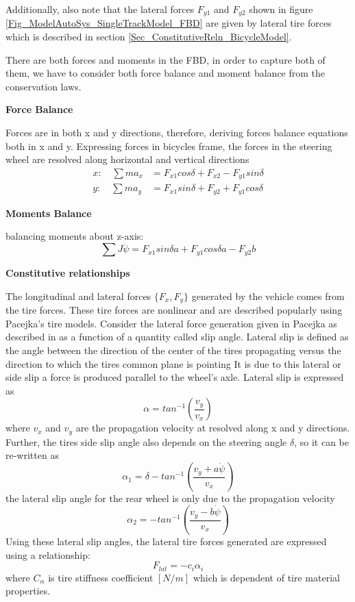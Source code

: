 Additionally, also note that the lateral forces $F_{y1}$ and $F_{y2}$ shown in figure \ref{Fig_ModelAutoSys_SingleTrackModel_FBD} are given by lateral tire forces which is described in section \ref{Sec_ConstitutiveReln_BicycleModel}.

There are both forces and moments in the FBD, in order to capture both of them, we have to consider both force balance and moment balance from the conservation laws.

\textbf{Force Balance}

Forces are in both x and y directions, therefore, deriving forces balance equations both in x and y. Expressing forces in bicycles frame, the forces in the steering wheel are resolved along horizontal and vertical directions
\begin{align}
	x: \quad \sum m a_x &= F_{x1}cos\delta + F_{x2} - F_{y1}sin\delta \\
	y: \quad \sum m a_y &= F_{x1}sin\delta + F_{y2} + F_{y1}cos\delta
\end{align}

\textbf{Moments Balance}

balancing moments about z-axis:
\begin{equation}
	\sum J \ddot{\psi} = F_{x1} sin\delta a + F_{y1} cos\delta a - F_{y2} b
\end{equation}

\textbf{Constitutive relationships} \label{Sec_ConstitutiveReln_BicycleModel}

The longitudinal and lateral forces $\{F_x, F_y\}$ generated by the vehicle comes from the tire forces. These tire forces are nonlinear and are described popularly using Pacejka's tire models. Consider the lateral force generation given in Pacejka as described in \cite[p.29]{Ahmed2018} as a function of a quantity called slip angle. Lateral slip is defined as the angle between the direction of the center of the tires propagating versus the direction to which the tires common plane is pointing It is due to this lateral or side slip a force is produced parallel to the wheel's axle. Lateral slip is expressed as \cite[p.31]{Ahmed2018}
\begin{equation}
	\alpha = tan^{-1}\left(\frac{v_y}{v_x}\right)
\end{equation}
where $v_x$ and $v_y$ are the propagation velocity at resolved along x and y directions. Further, the tires side slip angle also depends on the steering angle $\delta$, so it can be re-written as
\begin{equation}
	\alpha_{1} = \delta - tan^{-1}\left(\frac{v_y + a\dot{\psi}}{v_x}\right)
\end{equation}
the lateral slip angle for the rear wheel is only due to the propagation velocity
\begin{equation}
	\alpha_{2} = -tan^{-1}\left(\frac{v_y - b \dot{\psi}}{v_x}\right)
\end{equation}
Using these lateral slip angles, the lateral tire forces generated are expressed using a relationship:
\begin{equation}
	F_{lat} = -c_{i} \alpha_{i}
\end{equation}
where $C_{\alpha}$ is tire stiffness coefficient $[N/m]$ which is dependent of tire material properties.

